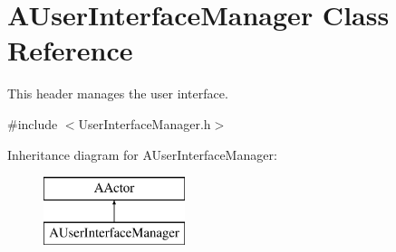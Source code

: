 \hypertarget{class_a_user_interface_manager}{}\section{A\+User\+Interface\+Manager Class Reference}
\label{class_a_user_interface_manager}


This header manages the user interface.  




{\ttfamily \#include $<$User\+Interface\+Manager.\+h$>$}

Inheritance diagram for A\+User\+Interface\+Manager\+:\begin{figure}[H]
\begin{center}
\leavevmode
\includegraphics[height=2.000000cm]{class_a_user_interface_manager}
\end{center}
\end{figure}
